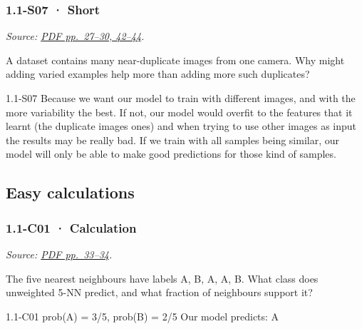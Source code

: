 \noindent\begin{minipage}{\linewidth}

\subsubsection{1.1-S07 · Short}\label{s07-short}

\emph{Source:
\href{../Lecture\%20Slides/1.1.\%20Fundamentals.pdf\#page=27}{PDF
pp.~27--30, 42--44}.}

A dataset contains many near-duplicate images from one camera. Why might
adding varied examples help more than adding more such duplicates?

\begin{solution}[20mm]{1.1-S07}
Because we want our model to train with different images, and with the more variability the best. If not, our model would overfit to the features that it learnt (the duplicate images ones) and when trying to use other images as input the results may be really bad. If we train with all samples being similar, our model will only be able to make good predictions for those kind of samples.
\end{solution}
\end{minipage}\par\medskip

\subsection{Easy calculations}\label{easy-calculations}

\noindent\begin{minipage}{\linewidth}

\subsubsection{1.1-C01 · Calculation}\label{c01-calculation}

\emph{Source:
\href{../Lecture\%20Slides/1.1.\%20Fundamentals.pdf\#page=33}{PDF
pp.~33--34}.}

The five nearest neighbours have labels A, B, A, A, B. What class does
unweighted 5-NN predict, and what fraction of neighbours support it?

\begin{solution}[26mm]{1.1-C01}
prob(A) = 3/5, prob(B) = 2/5
Our model predicts: A
\end{solution}
\end{minipage}\par\medskip

